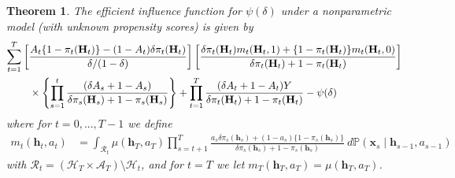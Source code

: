 \documentclass[12pt]{article}
\newcommand{\Pb}{\mathbb{P}}
\newcommand{\E}{\mathbb{E}}
\newcommand{\bx}{\mathbf{x}}
\newcommand{\bH}{\mathbf{H}}
\newcommand{\bh}{\mathbf{h}}
\newtheorem{theorem}{Theorem}
\theoremstyle{remark}
\begin{document}
\begin{theorem}
\label{thm:eif}
The efficient influence function for $\psi(\delta)$ under a nonparametric model (with unknown propensity scores) is given by
\begin{align*}
\sum_{t=1}^T  &  \left[ \frac{A_t \{1-\pi_t(\bH_t)\} - (1-A_t) \delta \pi_t(\bH_t) }{ \delta/(1-\delta)} \right] \left[ \frac{ \delta \pi_t(\bH_t) m_t(\bH_t,1) + \{1-\pi_t(\bH_t)\} m_t(\bH_t,0) } { \delta \pi_t(\bH_t) + 1 - \pi_t(\bH_t) } \right] \\
& \hspace{.1in} \times \left\{ \prod_{s=1}^{t} \frac{ (\delta A_s + 1-A_s) }{ \delta \pi_s(\bH_s) + 1 - \pi_s(\bH_s) } \right\} + \prod_{t=1}^{T} \frac{ (\delta A_t + 1-A_t) Y }{ \delta \pi_t(\bH_t) + 1 - \pi_t(\bH_t) }  - \psi(\delta)
\end{align*}
where for $t=0,...,T-1$ we define 
\begin{align*} m_t(\bh_t,a_t) &=  \int_{\mathcal{R}_t} \mu(\bh_T,a_T) \prod_{s={t+1}}^T  \frac{a_s \delta \pi_s(\bh_s) + (1-a_s) \{1-\pi_s(\bh_s)\} }{ \delta \pi_s(\bh_s) + 1- \pi_s(\bh_s) } \ d\Pb(\bx_{s} \mid \bh_{s-1},a_{s-1}) %
\end{align*}
with $\mathcal{R}_t= (\mathcal{H}_T \times \mathcal{A}_T) \setminus \mathcal{H}_t$, and for $t=T$ we let $m_T(\bh_T,a_T)=\mu(\bh_T,a_T)$.
\end{theorem}
\end{document}

